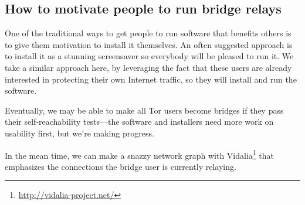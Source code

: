 \documentclass{llncs}
\begin{document}


\subsection{How to motivate people to run bridge relays}
\label{subsec:incentives}

One of the traditional ways to get people to run software that benefits
others is to give them motivation to install it themselves.  An often
suggested approach is to install it as a stunning screensaver so everybody
will be pleased to run it. We take a similar approach here, by leveraging
the fact that these users are already interested in protecting their
own Internet traffic, so they will install and run the software.

Eventually, we may be able to make all Tor users become bridges if they
pass their self-reachability tests---the software and installers need
more work on usability first, but we're making progress.

In the mean time, we can make a snazzy network graph with
Vidalia\footnote{\url{http://vidalia-project.net/}} that
emphasizes the connections the bridge user is currently relaying.





\end{document}
